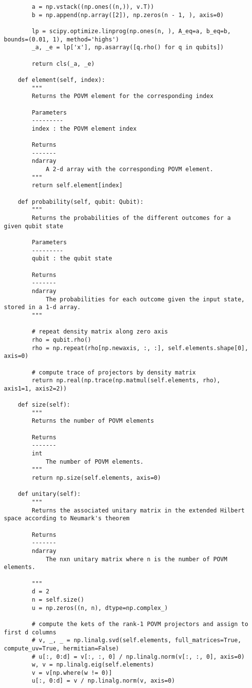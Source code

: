 \begin{verbatim}
        a = np.vstack((np.ones((n,)), v.T))
        b = np.append(np.array([2]), np.zeros(n - 1, ), axis=0)

        lp = scipy.optimize.linprog(np.ones(n, ), A_eq=a, b_eq=b, bounds=(0.01, 1), method='highs')
        _a, _e = lp['x'], np.asarray([q.rho() for q in qubits])

        return cls(_a, _e)

    def element(self, index):
        """
        Returns the POVM element for the corresponding index

        Parameters
        ---------
        index : the POVM element index

        Returns
        -------
        ndarray
            A 2-d array with the corresponding POVM element.
        """
        return self.element[index]

    def probability(self, qubit: Qubit):
        """
        Returns the probabilities of the different outcomes for a given qubit state

        Parameters
        ---------
        qubit : the qubit state

        Returns
        -------
        ndarray
            The probabilities for each outcome given the input state, stored in a 1-d array.
        """

        # repeat density matrix along zero axis
        rho = qubit.rho()
        rho = np.repeat(rho[np.newaxis, :, :], self.elements.shape[0], axis=0)

        # compute trace of projectors by density matrix
        return np.real(np.trace(np.matmul(self.elements, rho), axis1=1, axis2=2))

    def size(self):
        """
        Returns the number of POVM elements

        Returns
        -------
        int
            The number of POVM elements.
        """
        return np.size(self.elements, axis=0)

    def unitary(self):
        """
        Returns the associated unitary matrix in the extended Hilbert space according to Neumark's theorem

        Returns
        -------
        ndarray
            The nxn unitary matrix where n is the number of POVM elements.

        """
        d = 2
        n = self.size()
        u = np.zeros((n, n), dtype=np.complex_)

        # compute the kets of the rank-1 POVM projectors and assign to first d columns
        # v, _, _ = np.linalg.svd(self.elements, full_matrices=True, compute_uv=True, hermitian=False)
        # u[:, 0:d] = v[:, :, 0] / np.linalg.norm(v[:, :, 0], axis=0)
        w, v = np.linalg.eig(self.elements)
        v = v[np.where(w != 0)]
        u[:, 0:d] = v / np.linalg.norm(v, axis=0)


\end{verbatim}
